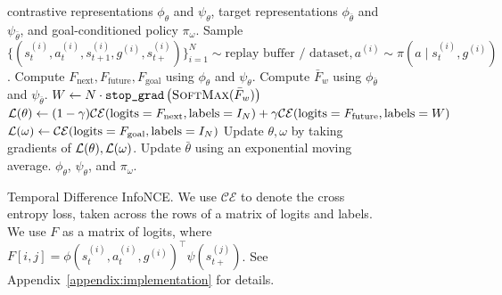 \documentclass{article} %
\newcommand{\CE}{\mathcal{CE}}
\begin{document}
\begin{figure}[t]
\vspace{-3em}
\begin{algorithm}[H]
    \caption{Temporal Difference InfoNCE. We use $\CE$ to denote the cross entropy loss, taken across the rows of a matrix of logits and labels. We use $F$ as a matrix of logits, where $F[i, j] = \phi(s_t^{(i)}, a_t^{(i)}, g^{(i)})^{\top} \psi(s_{t+}^{(j)})$. See Appendix~\ref{appendix:implementation} for details.} 
    \label{alg:td-infonce}
    \begin{algorithmic}[1]
         contrastive representations $\phi_{\theta}$ and $\psi_{\theta}$, target representations $\phi_{\bar{\theta}}$ and $\psi_{\bar{\theta}}$, and goal-conditioned policy $\pi_{\omega}$.
            \State Sample $\{ (s_t^{(i)}, a_t^{(i)}, s_{t + 1}^{(i)}, g^{(i)}, s_{t+}^{(i)}) \}_{i = 1}^N \sim \text{replay buffer / dataset}, a^{(i)} \sim \pi(a \mid s_{t}^{(i)}, g^{(i)})$.
            \State Compute $F_{\text{next}}, F_{\text{future}}, F_{\text{goal}}$ using $\phi_{\theta}$ and $\psi_{\theta}$.
            \State Compute $\bar{F}_{w}$ using $\phi_{\bar{\theta}}$ and $\psi_{\bar{\theta}}$.
            \State $W \leftarrow N \cdot \texttt{stop\_grad} \left(\textsc{SoftMax}(\bar{F}_{w}) \right)$
            \State $\gL(\theta) \leftarrow (1 - \gamma) \CE(\text{logits} = F_{\text{next}}, \text{labels} = I_N) + \gamma \CE(\text{logits} = F_{\text{future}}, \text{labels} = W)$
            \State $\gL(\omega) \leftarrow \CE(\text{logits} = F_{\text{goal}}, \text{labels} = I_N)$
            \State Update $\theta, \omega$ by taking gradients of ${\mathcal{L}}(\theta), {\mathcal{L}}(\omega)$.
            \State Update $\bar{\theta}$ using an exponential moving average.
        \EndFor
         $\phi_{\theta}$, $\psi_{\theta}$, and $\pi_{\omega}$.
    \end{algorithmic}
\end{algorithm}
\vspace{-2em}
\end{figure}
\end{document}

